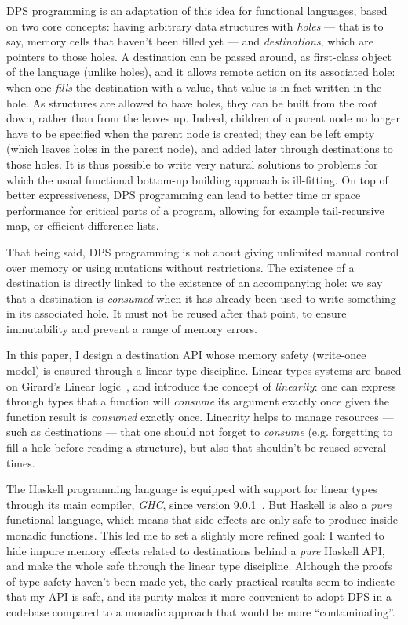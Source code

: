 \documentclass[english]{jflart}
\begin{document}
DPS programming is an adaptation of this idea for functional languages, based on two core concepts: having arbitrary data structures with \emph{holes} --- that is to say, memory cells that haven't been filled yet --- and \emph{destinations}, which are pointers to those holes. A destination can be passed around, as first-class object of the language (unlike holes), and it allows remote action on its associated hole: when one \emph{fills} the destination with a value, that value is in fact written in the hole. As structures are allowed to have holes, they can be built from the root down, rather than from the leaves up. Indeed, children of a parent node no longer have to be specified when the parent node is created; they can be left empty (which leaves holes in the parent node), and added later through destinations to those holes. It is thus possible to write very natural solutions to problems for which the usual functional bottom-up building approach is ill-fitting. On top of better expressiveness, DPS programming can lead to better time or space performance for critical parts of a program, allowing for example tail-recursive map, or efficient difference lists.

That being said, DPS programming is not about giving unlimited manual control over memory or using mutations without restrictions. The existence of a destination is directly linked to the existence of an accompanying hole: we say that a destination is \emph{consumed} when it has already been used to write something in its associated hole. It must not be reused after that point, to ensure immutability and prevent a range of memory errors.

In this paper, I design a destination API whose memory safety (write-once model) is ensured through a linear type discipline. Linear types systems are based on Girard's Linear logic~\cite{girard_linear_1995}, and introduce the concept of \emph{linearity}: one can express through types that a function will \emph{consume} its argument exactly once given the function result is \emph{consumed} exactly once. Linearity helps to manage resources --- such as destinations --- that one should not forget to \emph{consume} (e.g. forgetting to fill a hole before reading a structure), but also that shouldn't be reused several times.

The Haskell programming language is equipped with support for linear types through its main compiler, \emph{GHC}, since version 9.0.1~\cite{bernardy_linear_2018}. But Haskell is also a \emph{pure} functional language, which means that side effects are only safe to produce inside monadic functions. This led me to set a slightly more refined goal: I wanted to hide impure memory effects related to destinations behind a \emph{pure} Haskell API, and make the whole safe through the linear type discipline. Although the proofs of type safety haven't been made yet, the early practical results seem to indicate that my API is safe, and its purity makes it more convenient to adopt DPS in a codebase compared to a monadic approach that would be more ``contaminating''.
\end{document}
